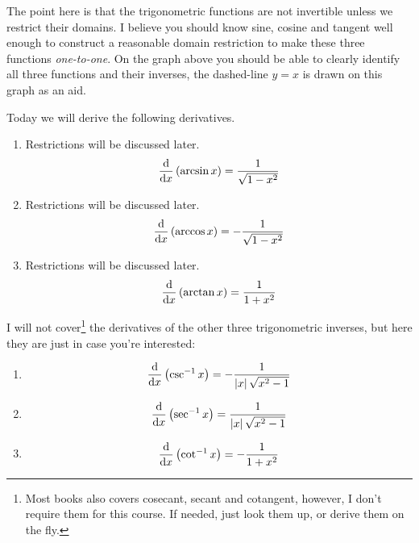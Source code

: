 \documentclass[12pt,addpoints, answers, fleqn]{exam}
\begin{document}
The point here is that the trigonometric functions are not invertible unless we restrict their domains. I believe you should know sine, cosine and tangent well enough to construct a reasonable domain restriction to make these three functions \emph{one-to-one}. On the graph above you should be able to clearly identify all three functions and their inverses, the dashed-line $y=x$ is drawn on this graph as an aid.



Today we will derive the following derivatives.
\begin{enumerate}
\item Restrictions will be discussed later.
\[
\frac{{\rm{d}}}{{\rm{d}}x} \left( \arcsin x \right) = \frac{1}{\sqrt{1-x^2}}
\]
\item Restrictions will be discussed later.
\[
\frac{{\rm{d}}}{{\rm{d}}x} \left( \arccos x \right) = -\frac{1}{\sqrt{1-x^2}}
\]
\item Restrictions will be discussed later.
\[
\frac{{\rm{d}}}{{\rm{d}}x} \left( \arctan x \right) = \frac{1}{1+x^2}
\]
\end{enumerate}

I will not cover\footnote{Most books also covers cosecant, secant and cotangent, however, I don't require them for this course. If needed, just look them up, or derive them on the fly.} the derivatives of the other three trigonometric inverses, but here they are just in case you're interested:
\begin{enumerate}
\item
\[
\frac{{\rm{d}}}{{\rm{d}}x} \left( \csc^{-1} x \right) = -\frac{1}{\left|x\right|\sqrt{x^2-1}}
\]
\item
\[
\frac{{\rm{d}}}{{\rm{d}}x} \left( \sec^{-1} x \right) = \frac{1}{\left|x\right|\sqrt{x^2-1}}
\]
\item
\[
\frac{{\rm{d}}}{{\rm{d}}x} \left( \cot^{-1} x \right) = -\frac{1}{1+x^2}
\]
\end{enumerate}
\end{document}
